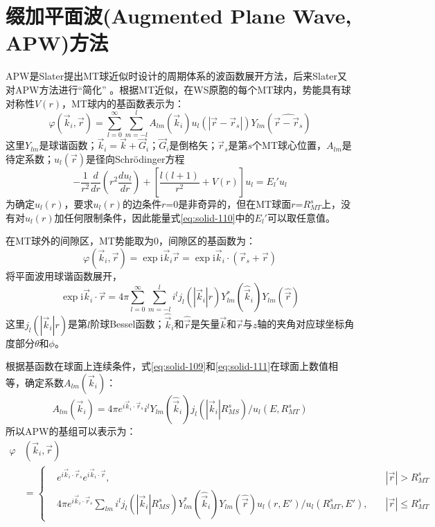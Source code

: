 \section{缀加平面波(Augmented Plane Wave, APW)方法}
APW是Slater提出MT球近似时设计的周期体系的波函数展开方法\cite{PR51-846_1937}，后来Slater又对APW方法进行“简化”\cite{PR91-528_1953}%
。根据MT近似，在WS原胞的每个MT球内，势能具有球对称性$V(r)$，MT球内的基函数表示为：
\begin{equation}
  \varphi(\vec k_i,\vec r)=\sum_{l=0}^{\infty}\sum_{m=-l}^lA_{lm}(\vec k_i)u_l(|\vec r-\vec r_s|)Y_{lm}(\widehat{\vec r-\vec r_s})
  \label{eq:solid-109}
\end{equation}
这里$Y_{lm}$是球谐函数；$\vec k_i=\vec k+\vec G_i$；$\vec G_i$是倒格矢；$\vec r_s$是第$s$个MT球心位置，$A_{lm}$是待定系数；$u_l(\vec r)$是径向Schr\"odinger方程
\begin{equation}
  -\frac1{r^2}\frac d{dr}\left(r^2\frac{du_l}{dr}\right)+\left[\frac{l(l+1)}{r^2}+V(r)\right]u_l=E_l'u_l
  \label{eq:solid-110}
\end{equation}
为确定$u_l(r)$，要求$u_l(r)$的边条件$r$=0是非奇异的，但在MT球面$r$=$R_{MT}^s$上，没有对$u_l(r)$加任何限制条件，因此能量式\eqref{eq:solid-110}中的$E_l'$可以取任意值。

在MT球外的间隙区，MT势能取为0，间隙区的基函数为：
\begin{equation}
	\varphi(\vec k_i,\vec r)=\exp\mathrm{i}\vec k_i\vec r=\exp\mathrm{i}\vec k_i\cdot(\vec r_s+\vec r)
  \label{eq:solid-111}
\end{equation}
将平面波用球谐函数展开，
\begin{equation}
	\exp\mathrm{i}\vec k_i\cdot\vec r=4\pi\sum_{l=0}^{\infty}\sum_{m=-l}^li^lj_l(|\vec k_i|r)Y_{lm}^{\ast}(\hat{\vec k}_i)Y_{lm}(\hat{\vec r})
  \label{eq:solid-112}
\end{equation}
这里$j_l(|\vec k_i|r)$是第$l$阶球Bessel函数；$\hat{\vec k}_i$和$\hat{\vec r}$是矢量$\vec k$和$\vec r$与$z$轴的夹角对应球坐标角度部分$\theta$和$\phi$。

根据基函数在球面上连续条件，式\eqref{eq:solid-109}和\eqref{eq:solid-111}在球面上数值相等，确定系数$A_{lm}(\vec k_i)$：
$$A_{lm}(\vec k_i)=4\pi e^{i\vec k_i\cdot\vec r_s}i^lY_{lm}(\hat{\vec k}_i)j_l(|\vec k_i|R_{MS}^s)/u_l(E,R_{MT}^s)$$
所以APW的基组可以表示为：
\begin{equation}
  \begin{split}
    \varphi&(\vec k_i,\vec r)\\
    &=\left\{\begin{aligned}
    &e^{i\vec k_i\cdot\vec r_s}e^{i\vec k_i\cdot\vec r},&|\vec r|>R_{MT}^s\\
    &4\pi e^{i\vec k_i\cdot\vec r_s}\sum_{lm}i^lj_l(|\vec k_i|R_{MS}^s)Y_{lm}^{\ast}(\hat{\vec k}_i)Y_{lm}(\hat{\vec r})u_l(r,E')/u_l(R_{MT}^s,E'),\quad&|\vec r|\leqslant R_{MT}^s
    \end{aligned} \right.
  \end{split}
  \label{eq:solid-113}
\end{equation}

